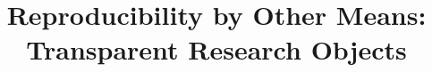 \documentclass[conference]{IEEEtran}
\begin{document}
\title{
    Reproducibility by Other Means:\\
    Transparent Research Objects
}


\end{document}
